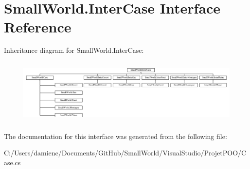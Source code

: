 \hypertarget{interface_small_world_1_1_inter_case}{\section{Small\-World.\-Inter\-Case Interface Reference}
\label{interface_small_world_1_1_inter_case}
}
Inheritance diagram for Small\-World.\-Inter\-Case\-:\begin{figure}[H]
\begin{center}
\leavevmode
\includegraphics[height=3.333333cm]{interface_small_world_1_1_inter_case}
\end{center}
\end{figure}


The documentation for this interface was generated from the following file\-:\begin{DoxyCompactItemize}
\item 
C\-:/\-Users/damienc/\-Documents/\-Git\-Hub/\-Small\-World/\-Visual\-Studio/\-Projet\-P\-O\-O/Case.\-cs\end{DoxyCompactItemize}
